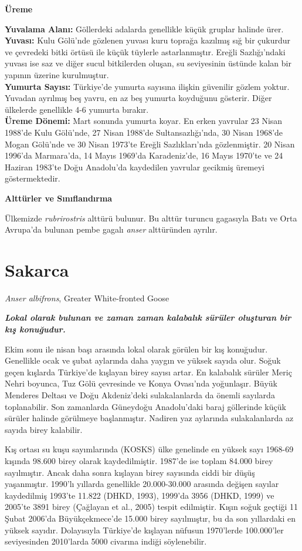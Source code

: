 \documentclass[
  a4paper,
  DIV=11,
  numbers=noendperiod]{scrartcl}
\begin{document}
\textbf{Üreme}

\textbf{Yuvalama Alanı:} Göllerdeki adalarda genellikle küçük gruplar
halinde ürer.\\
\textbf{Yuvası:} Kulu Gölü'nde gözlenen yuvası kuru toprağa kazılmış sığ
bir çukurdur ve çevredeki bitki örtüsü ile küçük tüylerle
astarlanmıştır. Ereğli Sazlığı'ndaki yuvası ise saz ve diğer sucul
bitkilerden oluşan, su seviyesinin üstünde kalan bir yapının üzerine
kurulmuştur.\\
\textbf{Yumurta Sayısı:} Türkiye'de yumurta sayısına ilişkin güvenilir
gözlem yoktur. Yuvadan ayrılmış beş yavru, en az beş yumurta koyduğunu
gösterir. Diğer ülkelerde genellikle 4-6 yumurta bırakır.\\
\textbf{Üreme Dönemi:} Mart sonunda yumurta koyar. En erken yavrular 23
Nisan 1988'de Kulu Gölü'nde, 27 Nisan 1988'de Sultansazlığı'nda, 30
Nisan 1968'de Mogan Gölü'nde ve 30 Nisan 1973'te Ereğli Sazlıkları'nda
gözlenmiştir. 20 Nisan 1996'da Marmara'da, 14 Mayıs 1969'da
Karadeniz'de, 16 Mayıs 1970'te ve 24 Haziran 1983'te Doğu Anadolu'da
kaydedilen yavrular gecikmiş üremeyi göstermektedir.

\textbf{Alttürler ve Sınıflandırma}

Ülkemizde \emph{rubrirostris} alttürü bulunur. Bu alttür turuncu
gagasıyla Batı ve Orta Avrupa'da bulunan pembe gagalı \emph{anser}
alttüründen ayrılır.

\section{Sakarca}\label{sakarca}

\emph{Anser albifrons}, Greater White-fronted Goose

\textbf{\emph{Lokal olarak bulunan ve zaman zaman kalabalık sürüler
oluşturan bir kış konuğudur.}}

Ekim sonu ile nisan başı arasında lokal olarak görülen bir kış
konuğudur. Genellikle ocak ve şubat aylarında daha yaygın ve yüksek
sayıda olur. Soğuk geçen kışlarda Türkiye'de kışlayan birey sayısı
artar. En kalabalık sürüler Meriç Nehri boyunca, Tuz Gölü çevresinde ve
Konya Ovası'nda yoğunlaşır. Büyük Menderes Deltası ve Doğu Akdeniz'deki
sulakalanlarda da önemli sayılarda toplanabilir. Son zamanlarda
Güneydoğu Anadolu'daki baraj göllerinde küçük sürüler halinde görülmeye
başlanmıştır. Nadiren yaz aylarında sulakalanlarda az sayıda birey
kalabilir.

Kış ortası su kuşu sayımlarında (KOSKS) ülke genelinde en yüksek sayı
1968-69 kışında 98.600 birey olarak kaydedilmiştir. 1987'de ise toplam
84.000 birey sayılmıştır. Ancak daha sonra kışlayan birey sayısında
ciddi bir düşüş yaşanmıştır. 1990'lı yıllarda genellikle 20.000-30.000
arasında değişen sayılar kaydedilmiş 1993'te 11.822 (DHKD, 1993),
1999'da 3956 (DHKD, 1999) ve 2005'te 3891 birey (Çağlayan et al., 2005)
tespit edilmiştir. Kışın soğuk geçtiği 11 Şubat 2006'da Büyükçekmece'de
15.000 birey sayılmıştır, bu da son yıllardaki en yüksek sayıdır.
Dolayısıyla Türkiye'de kışlayan nüfusun 1970'lerde 100.000'ler
seviyesinden 2010'larda 5000 civarına indiği söylenebilir.
\end{document}
